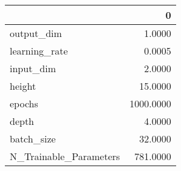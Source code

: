 \begin{tabular}{lr}
\toprule
{} &          0 \\
\midrule
output\_dim             &     1.0000 \\
learning\_rate          &     0.0005 \\
input\_dim              &     2.0000 \\
height                 &    15.0000 \\
epochs                 &  1000.0000 \\
depth                  &     4.0000 \\
batch\_size             &    32.0000 \\
N\_Trainable\_Parameters &   781.0000 \\
\bottomrule
\end{tabular}
